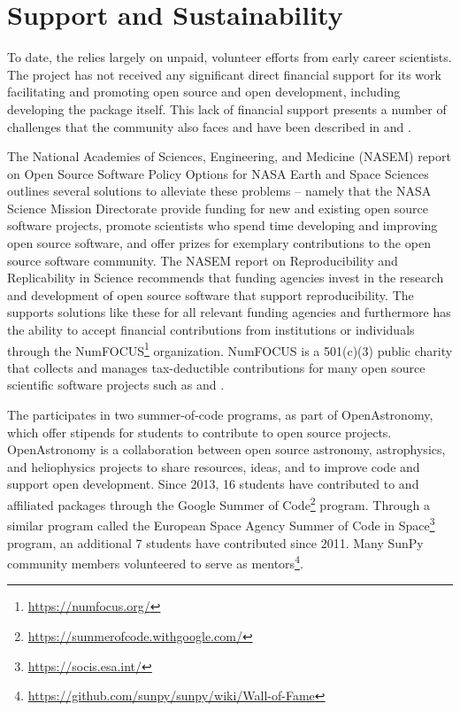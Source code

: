 \section{Support and Sustainability}
\label{sec:support}

To date, the \sunpyproj relies largely on unpaid, volunteer efforts from early career scientists.
The project has not received any significant direct financial support for its work facilitating and promoting open source and open development, including developing the \sunpypkg package itself.
This lack of financial support presents a number of challenges that the \astropy community also faces and have been described in \cite{PriceWhelan:2018ji} and \cite{Muna2016}.

The National Academies of Sciences, Engineering, and Medicine (NASEM) report on Open Source Software Policy Options for NASA Earth and Space Sciences \citep{NAP2018} outlines several solutions to alleviate these problems -- namely that the NASA Science Mission Directorate provide funding for new and existing open source software projects, promote scientists who spend time developing and improving open source software, and offer prizes for exemplary contributions to the open source software community.
The NASEM report on Reproducibility and Replicability in Science \citep{NAP2019} recommends that funding agencies invest in the research and development of open source software that support reproducibility.
The \sunpyproj supports solutions like these for all relevant funding agencies \citep{nas_sunpy_white_paper} and furthermore has the ability to accept financial contributions from institutions or individuals through the NumFOCUS\footnote{\url{https://numfocus.org/}} organization. NumFOCUS is a 501(c)(3) public charity that collects and manages tax-deductible contributions for many open source scientific software projects such as \numpy and \astropy.

The \sunpyproj participates in two summer-of-code programs, as part of OpenAstronomy, which offer stipends for students to contribute to open source projects.
OpenAstronomy is a collaboration between open source astronomy, astrophysics, and heliophysics projects to share resources, ideas, and to improve code and support open development.
Since 2013, 16 students have contributed to \sunpypkg and affiliated packages through the Google Summer of Code\footnote{\url{https://summerofcode.withgoogle.com/}} program.
Through a similar program called the European Space Agency Summer of Code in Space\footnote{\url{https://socis.esa.int/}} program, an additional 7 students have contributed since 2011.
Many SunPy community members volunteered to serve as mentors\footnote{\url{https://github.com/sunpy/sunpy/wiki/Wall-of-Fame}}.
